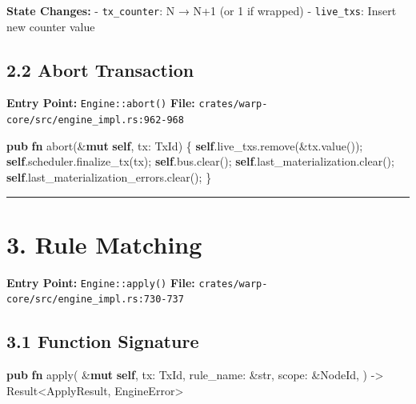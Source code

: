 \documentclass[
]{book}
\newenvironment{Shaded}{}{}
\newcommand{\DataTypeTok}[1]{\textcolor[rgb]{0.56,0.13,0.00}{#1}}
\newcommand{\KeywordTok}[1]{\textcolor[rgb]{0.00,0.44,0.13}{\textbf{#1}}}
\newcommand{\NormalTok}[1]{#1}
\newcommand{\OperatorTok}[1]{\textcolor[rgb]{0.40,0.40,0.40}{#1}}
\begin{document}
\textbf{State Changes:} - \texttt{tx\_counter}: N → N+1 (or 1 if
wrapped) - \texttt{live\_txs}: Insert new counter value

\subsection{2.2 Abort Transaction}\label{abort-transaction}

\textbf{Entry Point:} \texttt{Engine::abort()} \textbf{File:}
\texttt{crates/warp-core/src/engine\_impl.rs:962-968}

\begin{Shaded}
\begin{Highlighting}[]
\KeywordTok{pub} \KeywordTok{fn}\NormalTok{ abort(}\OperatorTok{\&}\KeywordTok{mut} \KeywordTok{self}\OperatorTok{,}\NormalTok{ tx}\OperatorTok{:}\NormalTok{ TxId) }\OperatorTok{\{}
    \KeywordTok{self}\OperatorTok{.}\NormalTok{live\_txs}\OperatorTok{.}\NormalTok{remove(}\OperatorTok{\&}\NormalTok{tx}\OperatorTok{.}\NormalTok{value())}\OperatorTok{;}
    \KeywordTok{self}\OperatorTok{.}\NormalTok{scheduler}\OperatorTok{.}\NormalTok{finalize\_tx(tx)}\OperatorTok{;}
    \KeywordTok{self}\OperatorTok{.}\NormalTok{bus}\OperatorTok{.}\NormalTok{clear()}\OperatorTok{;}
    \KeywordTok{self}\OperatorTok{.}\NormalTok{last\_materialization}\OperatorTok{.}\NormalTok{clear()}\OperatorTok{;}
    \KeywordTok{self}\OperatorTok{.}\NormalTok{last\_materialization\_errors}\OperatorTok{.}\NormalTok{clear()}\OperatorTok{;}
\OperatorTok{\}}
\end{Highlighting}
\end{Shaded}

\begin{center}\rule{0.5\linewidth}{0.5pt}\end{center}

\section{3. Rule Matching}\label{rule-matching}

\textbf{Entry Point:} \texttt{Engine::apply()} \textbf{File:}
\texttt{crates/warp-core/src/engine\_impl.rs:730-737}

\subsection{3.1 Function Signature}\label{function-signature-1}

\begin{Shaded}
\begin{Highlighting}[]
\KeywordTok{pub} \KeywordTok{fn}\NormalTok{ apply(}
    \OperatorTok{\&}\KeywordTok{mut} \KeywordTok{self}\OperatorTok{,}
\NormalTok{    tx}\OperatorTok{:}\NormalTok{ TxId}\OperatorTok{,}
\NormalTok{    rule\_name}\OperatorTok{:} \OperatorTok{\&}\DataTypeTok{str}\OperatorTok{,}
\NormalTok{    scope}\OperatorTok{:} \OperatorTok{\&}\NormalTok{NodeId}\OperatorTok{,}
\NormalTok{) }\OperatorTok{{-}\textgreater{}} \DataTypeTok{Result}\OperatorTok{\textless{}}\NormalTok{ApplyResult}\OperatorTok{,}\NormalTok{ EngineError}\OperatorTok{\textgreater{}}
\end{Highlighting}
\end{Shaded}
\end{document}
